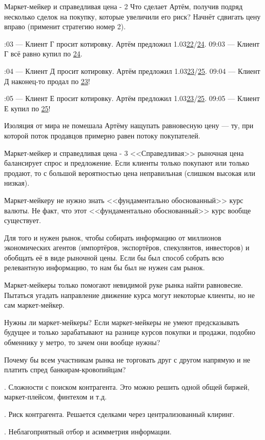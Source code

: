 \documentclass{beamer}
\newcommand{\eurusdBigFigures}{1.03}
\begin{document}
\begin{frame}{Маркет-мейкер и справедливая цена - 2}
\justify
Что сделает Артём, получив подряд несколько сделок на покупку, которые увеличили 
его риск? Начнёт сдвигать цену вправо (применит стратегию номер 2).

:03 --- Клиент Г просит котировку. Артём предложил \eurusdBigFigures\underline{22}/\underline{24}.
09:03 --- Клиент Г всё равно купил по \underline{24}.

:04 --- Клиент Д просит котировку. Артём предложил \eurusdBigFigures\underline{23}/\underline{25}.
09:04 --- Клиент Д наконец-то продал по \underline{23}!

:05 --- Клиент Е просит котировку. Артём предложил \eurusdBigFigures\underline{23}/\underline{25}.
09:05 --- Клиент Е купил по \underline{25}!

\justify
Изоляция от мира не помешала Артёму нащупать равновесную цену --- ту, при которой поток продавцов примерно равен потоку покупателей.
\end{frame}



\begin{frame}{Маркет-мейкер и справедливая цена - 3}
\justify
<<Справедливая>> рыночная цена балансирует спрос и предложение.
Если клиенты только покупают или только продают, то с большой вероятностью цена 
неправильная (слишком высокая или низкая).

\justify
Маркет-мейкеру не нужно знать <<фундаментально обоснованный>> курс валюты. Не факт, что этот <<фундаментально обоснованный>> курс вообще существует.

\justify
Для того и нужен рынок, чтобы собирать информацию от миллионов экономических 
агентов (импортёров, экспортёров, спекулянтов, инвесторов) и обобщать её в виде
рыночной цены. Если бы был способ собрать всю релевантную информацию, то нам бы
был не нужен сам рынок.

\justify
Маркет-мейкеры только помогают невидимой руке рынка найти равновесие. Пытаться 
угадать направление движение курса могут некоторые клиенты, но не сам маркет-мейкер.
\end{frame}



\begin{frame}{Нужны ли маркет-мейкеры?}
\justify
Если маркет-мейкеры не умеют предсказывать будущее и только зарабатывают на 
разнице курсов покупки и продажи, подобно обменнику у метро, то зачем они вообще 
нужны?

\justify
Почему бы всем участникам рынка не торговать друг с другом напрямую и не платить
спред банкирам-кровопийцам?

. Сложности с поиском контрагента. Это можно решить одной общей биржей,
маркет-плейсом, финтехом и т.д.

. Риск контрагента. Решается сделками через централизованный клиринг.

. Неблагоприятный отбор и асимметрия информации.
\end{frame}
\end{document}
